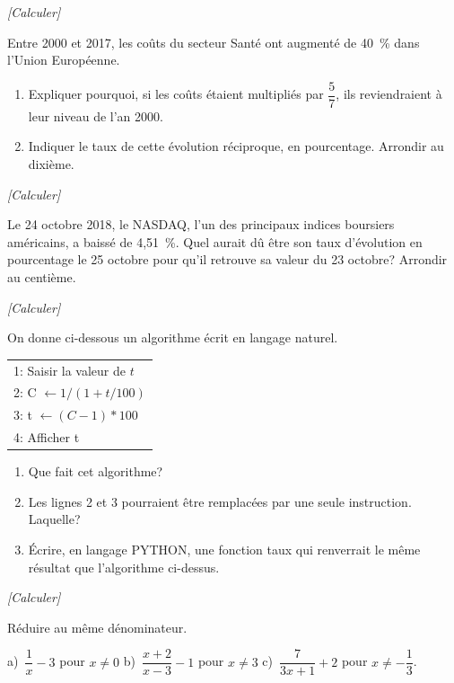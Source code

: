 \exo \textit{[Calculer]}

Entre 2000 et 2017, les coûts du secteur Santé ont augmenté de 40~\% dans l'Union Européenne.

\begin{enumerate}
\item Expliquer pourquoi, si les coûts étaient multipliés par $\dfrac{5}{7}$, ils reviendraient à leur niveau de l'an 2000.
\item Indiquer le taux de cette évolution réciproque, en pourcentage. Arrondir au dixième. 
\end{enumerate}

\exo \textit{[Calculer]}

Le 24 octobre 2018, le NASDAQ, l'un des principaux indices boursiers américains, a baissé de 4,51~\%. Quel aurait dû être son taux d'évolution en pourcentage le 25 octobre pour qu'il retrouve sa valeur du 23 octobre? Arrondir au centième.

\exo \textit{[Calculer]}

On donne ci-dessous un algorithme écrit en langage naturel.

\medskip

\begin{tabular}{|l}
1: Saisir la valeur de $t$\\

2: C $\leftarrow 1/(1+t/100)$ \\

3: t $\leftarrow (C-1)*100$ \\

4: Afficher t\\
\end{tabular}


\begin{enumerate}
\item Que fait cet algorithme?
\item Les lignes 2 et 3 pourraient être remplacées par une seule instruction. Laquelle?
\item Écrire, en langage PYTHON, une fonction taux qui renverrait le même résultat que l'algorithme ci-dessus.
\end{enumerate}

\exo \textit{[Calculer]}

Réduire au même dénominateur.

\medskip

a)~$\dfrac{1}{x}-3$ pour $x \neq 0$ \hspace{1cm} b)~$\dfrac{x+2}{x-3}-1$ pour $x \neq 3$ \hspace{1cm} c)~$\dfrac{7}{3x+1}+2$ pour $x \neq -\dfrac{1}{3}$.


